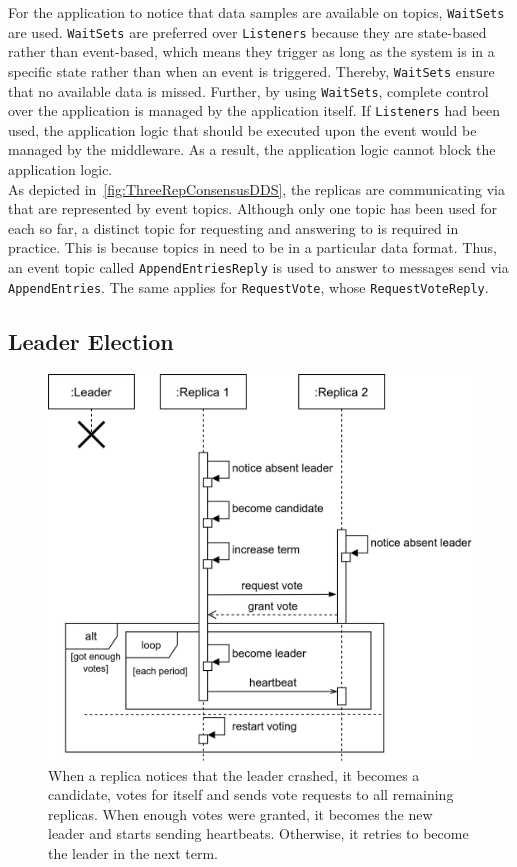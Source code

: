 For the application to notice that data samples are available on topics,  \texttt{WaitSets} are used.
\texttt{WaitSets} are preferred over  \texttt{Listeners} because they are state-based rather than event-based, which means they trigger as long as the system is in a specific state rather than when an event is triggered.
Thereby, \texttt{WaitSets} ensure that no available data is missed.
Further, by using \texttt{WaitSets}, complete control over the application is managed by the application itself.
If \texttt{Listeners} had been used, the application logic that should be executed upon the event would be managed by the middleware.
As a result, the application logic cannot block the application logic.
\\

As depicted in~\autoref{fig:ThreeRepConsensusDDS}, the replicas are communicating via  that are represented by  event topics.
Although only one topic has been used for each  so far, a distinct  topic for requesting and answering to  is required in practice.
This is because topics in  need to be in a particular data format.
Thus, an event topic called \texttt{AppendEntriesReply} is used to answer to messages send via \texttt{AppendEntries}.
The same applies for \texttt{RequestVote}, whose \texttt{RequestVoteReply}.


\subsection{Leader Election}
\begin{figure}[!hb]
	\centering
	\includegraphics[width=0.75\linewidth]{images/sequence/LeaderElection}
	\caption{When a replica notices that the leader crashed, it becomes a candidate, votes for itself and sends vote requests to all remaining replicas. When enough votes were granted, it becomes the new leader and starts sending heartbeats. Otherwise, it retries to become the leader in the next term.}
	\label{fig:SeqLeaderElection}
\end{figure}

